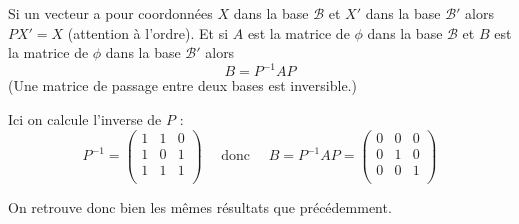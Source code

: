 {\begin{enumerate}
{Si un vecteur a pour coordonnées $X$ dans la base $\mathcal{B}$ et $X'$ dans la base $\mathcal{B}'$
alors $PX'=X$ (attention à l'ordre).
Et si $A$ est la matrice de $\phi$ dans la base $\mathcal{B}$ et $B$ est la matrice de $\phi$ dans la base
$\mathcal{B}'$ alors
$$B=P^{-1}AP$$
(Une matrice de passage entre deux bases est inversible.)

Ici on calcule l'inverse de $P$ :
$$P^{-1} = \begin{pmatrix}
1 & 1 & 0 \\
1 & 0 & 1 \\
1 & 1 & 1 \\    
\end{pmatrix}
\quad \text{ donc } \quad 
B=P^{-1}AP=\begin{pmatrix}
0 & 0 & 0 \\
0 & 1 & 0 \\
0 & 0 & 1 \\   
\end{pmatrix}
$$

On retrouve donc bien les mêmes résultats que précédemment.}
\end{enumerate}
}
